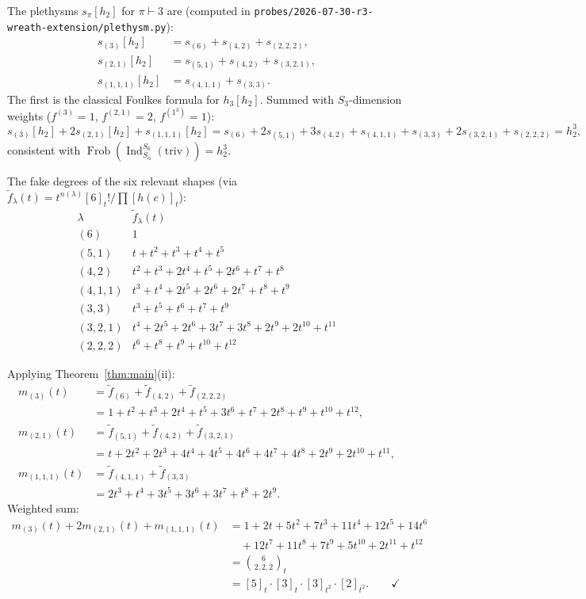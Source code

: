 \documentclass[11pt]{article}
\theoremstyle{definition}
\theoremstyle{remark}
\newcommand{\Frob}{\operatorname{Frob}}
\newcommand{\Ind}{\operatorname{Ind}}
\newcommand{\triv}{\mathrm{triv}}
\newcommand{\fdeg}{\widetilde{f}}
\begin{document}
The plethysms $s_\pi[h_2]$ for $\pi \vdash 3$ are (computed in
\texttt{probes/2026-07-30-r3-wreath-extension/plethysm.py}):
\begin{align*}
s_{(3)}[h_2] &= s_{(6)} + s_{(4,2)} + s_{(2,2,2)}, \\
s_{(2,1)}[h_2] &= s_{(5,1)} + s_{(4,2)} + s_{(3,2,1)}, \\
s_{(1,1,1)}[h_2] &= s_{(4,1,1)} + s_{(3,3)}.
\end{align*}
The first is the classical Foulkes formula for $h_3[h_2]$. Summed with
$S_3$-dimension weights ($f^{(3)} = 1$, $f^{(2,1)} = 2$, $f^{(1^3)} = 1$):
\[
s_{(3)}[h_2] + 2 s_{(2,1)}[h_2] + s_{(1,1,1)}[h_2]
= s_{(6)} + 2 s_{(5,1)} + 3 s_{(4,2)} + s_{(4,1,1)} + s_{(3,3)} + 2 s_{(3,2,1)} + s_{(2,2,2)} = h_2^3,
\]
consistent with $\Frob(\Ind_{S_\alpha}^{S_6}(\triv)) = h_2^3$.

The fake degrees of the six relevant shapes (via $\fdeg_\lambda(t) = t^{n(\lambda)}[6]_t!/\prod [h(c)]_t$):
\[
\begin{array}{r|l}
\lambda & \fdeg_\lambda(t) \\ \hline
(6)     & 1 \\
(5,1)   & t + t^2 + t^3 + t^4 + t^5 \\
(4,2)   & t^2 + t^3 + 2t^4 + t^5 + 2t^6 + t^7 + t^8 \\
(4,1,1) & t^3 + t^4 + 2t^5 + 2t^6 + 2t^7 + t^8 + t^9 \\
(3,3)   & t^3 + t^5 + t^6 + t^7 + t^9 \\
(3,2,1) & t^4 + 2t^5 + 2t^6 + 3t^7 + 3t^8 + 2t^9 + 2t^{10} + t^{11} \\
(2,2,2) & t^6 + t^8 + t^9 + t^{10} + t^{12}
\end{array}
\]

Applying Theorem~\ref{thm:main}(ii):
\begin{align*}
m_{(3)}(t) &= \fdeg_{(6)} + \fdeg_{(4,2)} + \fdeg_{(2,2,2)} \\
&= 1 + t^2 + t^3 + 2t^4 + t^5 + 3t^6 + t^7 + 2t^8 + t^9 + t^{10} + t^{12},\\
m_{(2,1)}(t) &= \fdeg_{(5,1)} + \fdeg_{(4,2)} + \fdeg_{(3,2,1)} \\
&= t + 2t^2 + 2t^3 + 4t^4 + 4t^5 + 4t^6 + 4t^7 + 4t^8 + 2t^9 + 2t^{10} + t^{11},\\
m_{(1,1,1)}(t) &= \fdeg_{(4,1,1)} + \fdeg_{(3,3)} \\
&= 2t^3 + t^4 + 3t^5 + 3t^6 + 3t^7 + t^8 + 2t^9.
\end{align*}
Weighted sum:
\begin{align*}
m_{(3)}(t) + 2 m_{(2,1)}(t) + m_{(1,1,1)}(t)
&= 1 + 2t + 5t^2 + 7t^3 + 11t^4 + 12t^5 + 14t^6 \\
&\quad {}+ 12t^7 + 11t^8 + 7t^9 + 5t^{10} + 2t^{11} + t^{12} \\
&= \binom{6}{2,2,2}_t \\
&= [5]_t \cdot [3]_t \cdot [3]_{t^2} \cdot [2]_{t^2}. \qquad \checkmark
\end{align*}
\end{document}
